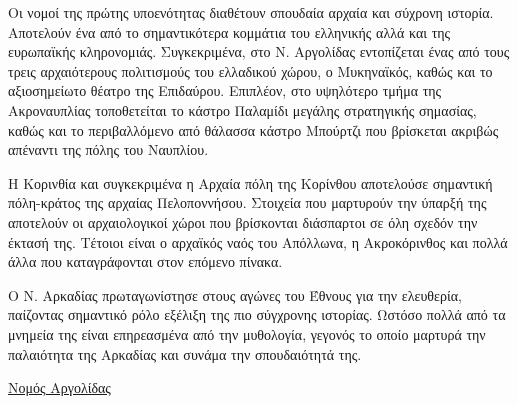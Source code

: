 \documentclass[12pt]{article}
\begin{document}
	Οι νομοί της πρώτης υποενότητας διαθέτουν σπουδαία αρχαία και σύχρονη ιστορία. Αποτελούν ένα από το σημαντικότερα κομμάτια του ελληνικής αλλά και της ευρωπαϊκής κληρονομιάς. Συγκεκριμένα, στο Ν. Αργολίδας εντοπίζεται ένας από τους τρεις αρχαιότερους πολιτισμούς του ελλαδικού χώρου, ο Μυκηναϊκός, καθώς και το αξιοσημείωτο θέατρο της Επιδαύρου. Επιπλέον, στο υψηλότερο τμήμα της Ακροναυπλίας τοποθετείται το κάστρο Παλαμίδι μεγάλης στρατηγικής σημασίας, καθώς και το περιβαλλόμενο από θάλασσα κάστρο Μπούρτζι που βρίσκεται ακριβώς απέναντι της πόλης του Ναυπλίου. 
	
	Η Κορινθία και συγκεκριμένα η Αρχαία πόλη της Κορίνθου αποτελούσε σημαντική πόλη-κράτος της αρχαίας Πελοποννήσου. Στοιχεία που μαρτυρούν την ύπαρξή της αποτελούν οι αρχαιολογικοί χώροι που βρίσκονται διάσπαρτοι σε όλη σχεδόν την έκτασή της. Τέτοιοι είναι ο αρχαϊκός ναός του Απόλλωνα, η Ακροκόρινθος και πολλά άλλα που καταγράφονται στον επόμενο πίνακα.
	
	Ο Ν. Αρκαδίας πρωταγωνίστησε στους αγώνες του Έθνους για την ελευθερία, παίζοντας σημαντικό ρόλο εξέλιξη της πιο σύγχρονης ιστορίας. Ωστόσο πολλά από τα μνημεία της είναι επηρεασμένα από την μυθολογία, γεγονός το οποίο μαρτυρά την παλαιότητα της Αρκαδίας και συνάμα την σπουδαιότητά της. 
	
	\underline{Νομός Αργολίδας}
	
\end{document}
